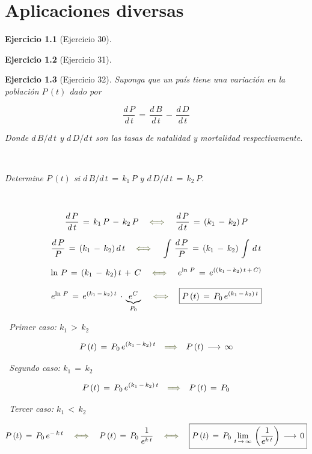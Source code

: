 \documentclass[a4paper,11pt,openany]{book}
\newtheorem{ejer}{Ejercicio}[section]
\begin{document}
\chapter{Aplicaciones diversas} 

\begin{ejer}[Ejercicio 30] 

\end{ejer} 

\begin{ejer}[Ejercicio 31] 

\end{ejer} 

\begin{ejer}[Ejercicio 32]
 
Suponga que un país tiene una variación en la población $P\,(t)$ dado por
 
$$\boxed{\dfrac{d\,P}{d\,t}\,=\,\dfrac{d\,B}{d\,t}\,-\,\dfrac{d\,D}{d\,t}}$$ 
 
Donde $d\,B/d\,t$ y $d\,D/d\,t$ son las tasas de natalidad y mortalidad respectivamente.
 
\
 
Determine $P\,(t)$ si $d\,B/d\,t\,=\,k_{1}\,P$ y $d\,D/d\,t\,=\,k_{2}\,P$.
 
\ 
 
 
$$\dfrac{d\,P}{d\,t}\,=\,k_{1}\,P\,-\,k_{2}\,P \quad \textcolor{armygreen}{\iff} \quad \dfrac{d\,P}{d\,t}\,=\,(k_{1}\,-\,k_{2})\,P$$
 
$$\dfrac{d\,P}{P}\,=\,(k_{1}\,-\,k_{2})\,d\,t \quad \textcolor{armygreen}{\iff} \quad \int\,\dfrac{d\,P}{P}\,=\,(k_{1}\,-\,k_{2})\,\int\,d\,t$$
 
$$\ln\,P\,=\,(k_{1}\,-\,k_{2})\,t\,+\,C \quad \textcolor{armygreen}{\iff} \quad e^{\ln\,P}\,=\,e^{((k_{1}\,-\,k_{2})\,t\,+\,C ) }$$
 
$$e^{\ln\,P}\,=\,e^{(k_{1}\,-\,k_{2})\,t}\,\cdot\,\underbrace{e^{C}}_{P_{0}}\quad \textcolor{armygreen}{\iff} \quad \boxed{P\,(t)\,=\,P_{0}\,e^{(k_{1}\,-\,k_{2})\,t}}$$
 
\textcolor{armygreen}{\Writinghand}\, Primer caso: $\boxed{k_{1}\,>\,k_{2}}$
 
$$P\,(t)\,=\,P_{0}\,e^{(k_{1}\,-\,k_{2})\,t} \quad \textcolor{armygreen}{\Longrightarrow} \quad P\,(t) \, \longrightarrow \, \infty$$
 
\textcolor{armygreen}{\Writinghand}\, Segundo caso: $\boxed{k_{1}\,=\,k_{2}}$
 
$$P\,(t)\,=\,P_{0}\,e^{(k_{1}\,-\,k_{2})\,t} \quad \textcolor{armygreen}{\Longrightarrow} \quad P\,(t)\,=\,P_{0}$$
 
\textcolor{armygreen}{\Writinghand}\, Tercer caso: $\boxed{k_{1}\,<\,k_{2}}$
 
$$P\,(t)\,=\,P_{0}\,e^{-\,k\,t} \quad \textcolor{armygreen}{\iff} \quad P\,(t)\,=\,P_{0}\,\dfrac{1}{e^{k\,t}} \quad \textcolor{armygreen}{\iff} \quad \boxed{P\,(t)\,=\,P_{0}\,\lim_{t\,\rightarrow\,\infty}\,\left(\dfrac{1}{e^{k\,t}} \right) \, \longrightarrow \, 0}$$
 

\end{ejer} 
\end{document}

